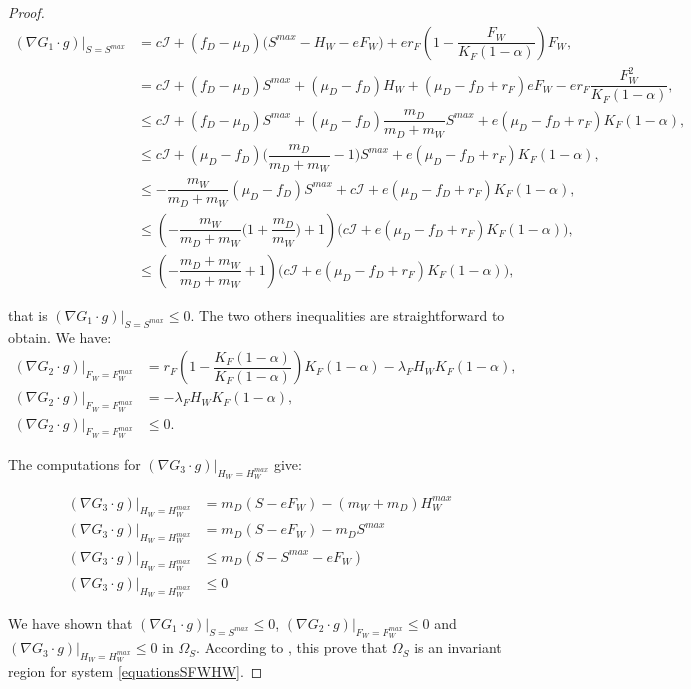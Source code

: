 \documentclass{article}
\newcommand{\lfw}{\lambda_{F}}
\newcommand{\lfw}{\lambda_{F}}
\newcommand{\cI}{c \mathcal{I}}
\begin{document}
\begin{proof}
\begin{align*}
(\nabla G_1 \cdot g)|_{S = S^{max}} &= \cI + (f_D - \mu_D) \Big(S^{max} - H_W - eF_W \Big) + e r_F \left(1 - \dfrac{F_W}{K_F(1-\alpha)} \right) F_W, \\
&= \cI + (f_D - \mu_D) S^{max} + (\mu_D - f_D) H_W + (\mu_D - f_D + r_F)eF_W - e r_F \dfrac{F_W^2}{K_F(1-\alpha)}, \\
&\leq  \cI + (f_D - \mu_D) S^{max} +(\mu_D - f_D) \dfrac{m_D}{m_D + m_W} S^{max} +e (\mu_D - f_D + r_F) K_F(1-\alpha), \\
&\leq  \cI + (\mu_D - f_D)\big(\dfrac{m_D}{m_D + m_W} - 1\Big)S^{max} +e (\mu_D - f_D + r_F) K_F(1-\alpha), \\
&\leq  - \dfrac{m_W}{m_D + m_W}(\mu_D - f_D)S^{max} +\cI +e (\mu_D - f_D + r_F) K_F(1-\alpha), \\
&\leq \left(-\dfrac{m_W}{m_D + m_W} \Big(1+ \dfrac{m_D}{m_W}\Big) + 1 \right) \Big(\cI +e (\mu_D - f_D + r_F) K_F(1-\alpha)\Big),\\
&\leq \left(-\dfrac{m_D + m_W}{m_D + m_W} + 1 \right) \Big(\cI +e (\mu_D - f_D + r_F) K_F(1-\alpha)\Big),
\end{align*}

that is $(\nabla G_1 \cdot g)|_{S = S^{max}} \leq 0$. The two others inequalities are straightforward to obtain. We have:
\begin{align*}
(\nabla G_2 \cdot g)|_{F_W = F_W^{max}} &= r_F  \left(1 - \dfrac{K_F (1-\alpha)}{K_F (1-\alpha)}\right)K_F (1-\alpha)  - \lfw H_W K_F (1-\alpha), \\
(\nabla G_2 \cdot g)|_{F_W = F_W^{max}} & = - \lfw H_W K_F (1-\alpha), \\
(\nabla G_2 \cdot g)|_{F_W = F_W^{max}} & \leq 0.
\end{align*}

The computations for $(\nabla G_3 \cdot g)|_{H_W = H_W^{max}}$ give:

\begin{align*}
(\nabla G_3 \cdot g)|_{H_W = H_W^{max}} &= m_D (S - eF_W) - (m_W + m_D) H_W^{max} \\
(\nabla G_3 \cdot g)|_{H_W = H_W^{max}} &= m_D (S - eF_W) - m_D S^{max} \\
(\nabla G_3 \cdot g)|_{H_W = H_W^{max}} & \leq m_D (S - S^{max} -  eF_W) \\
(\nabla G_3 \cdot g)|_{H_W = H_W^{max}} & \leq 0
\end{align*}

We have shown that $(\nabla G_1 \cdot g)|_{S = S^{max}} \leq 0$, $(\nabla G_2 \cdot g)|_{F_W = F_W^{max}} \leq 0$ and $(\nabla G_3 \cdot g)|_{H_W = H_W^{max}} \leq 0$ in  $\Omega_S$.  According to \cite{smoller_shock_1994}, this prove that $\Omega_S$ is an invariant region for system \eqref{equationsSFWHW}.


\end{proof}
\end{document}
